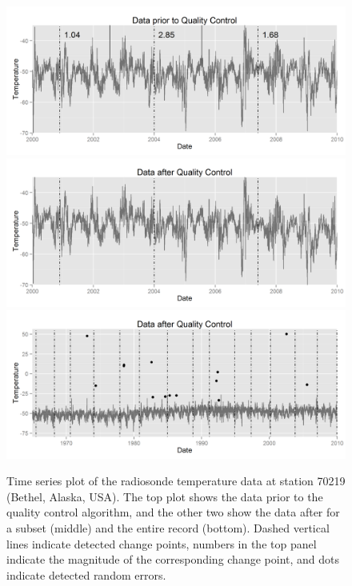 \documentclass[12pt]{article}
\begin{document}
\begin{figure}
	\centering
	\includegraphics[width=.9\textwidth]{"70219_Data_Unhomogenized_zoomed"}
	\includegraphics[width=.9\textwidth]{"70219_Data_Homogenized_zoomed"}
	\includegraphics[width=.9\textwidth]{"70219_Data_Homogenized"}	
	\caption{Time series plot of the radiosonde temperature data at station 70219 (Bethel, Alaska, USA).  The top plot shows the data prior to the quality control algorithm, and the other two show the data after for a subset (middle) and the entire record (bottom).  Dashed vertical lines indicate detected change points, numbers in the top panel indicate the magnitude of the corresponding change point, and dots indicate detected random errors.}
	\label{fig:caseStudy}
\end{figure}

\end{document}
